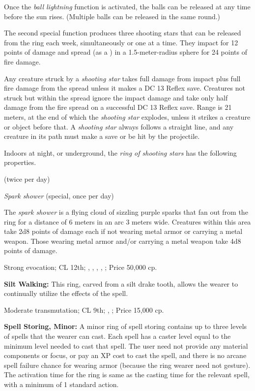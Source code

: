 Once the \emph{ball lightning} function is activated, the balls can be released at any time before the sun rises. (Multiple balls can be released in the same round.)

The second special function produces three shooting stars that can be released from the ring each week, simultaneously or one at a time. They impact for 12 points of damage and spread (as a ) in a 1.5-meter-radius sphere for 24 points of fire damage.

Any creature struck by a \emph{shooting star} takes full damage from impact plus full fire damage from the spread unless it makes a DC 13 Reflex save. Creatures not struck but within the spread ignore the impact damage and take only half damage from the fire spread on a successful DC 13 Reflex save. Range is 21 meters, at the end of which the \emph{shooting star} explodes, unless it strikes a creature or object before that. A \emph{shooting star} always follows a straight line, and any creature in its path must make a save or be hit by the projectile.

Indoors at night, or underground, the \emph{ring of shooting stars} has the following properties.

\begin{itemize*}
\item {} (twice per day)
\item \emph{Spark shower} (special, once per day)
\end{itemize*}

The \emph{spark shower} is a flying cloud of sizzling purple sparks that fan out from the ring for a distance of 6 meters in an arc 3 meters wide. Creatures within this area take 2d8 points of damage each if not wearing metal armor or carrying a metal weapon. Those wearing metal armor and/or carrying a metal weapon take 4d8 points of damage.

Strong evocation; CL 12th; , , , , ; Price 50,000 cp.

\textbf{Silt Walking:} This ring, carved from a silt drake tooth, allows the wearer to continually utilize the effects of the  spell.

Moderate transmutation; CL 9th; , ; Price 15,000 cp.

\textbf{Spell Storing, Minor:} A minor ring of spell storing contains up to three levels of spells that the wearer can cast. Each spell has a caster level equal to the minimum level needed to cast that spell. The user need not provide any material components or focus, or pay an XP cost to cast the spell, and there is no arcane spell failure chance for wearing armor (because the ring wearer need not gesture). The activation time for the ring is same as the casting time for the relevant spell, with a minimum of 1 standard action.

